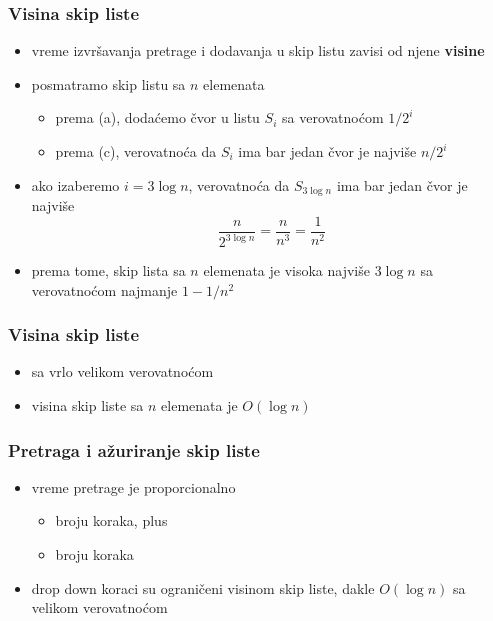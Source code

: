 \documentclass[compress]{beamer}
\begin{document}
\begin{frame}[fragile]
  \frametitle{Visina skip liste}
  \begin{itemize}
    \item vreme izvršavanja pretrage i dodavanja u skip listu zavisi od njene \textbf{visine}
    \item posmatramo skip listu sa $n$ elemenata
    \begin{itemize}
      \item prema (a), dodaćemo čvor u listu $S_i$ sa verovatnoćom $1/2^i$
      \item prema (c), verovatnoća da $S_i$ ima bar jedan čvor je najviše $n/2^i$
    \end{itemize}
    \item ako izaberemo $i=3\log n$, verovatnoća da $S_{3\log n}$ ima bar jedan čvor je najviše
    $$\frac{n}{2^{3\log n}} = \frac{n}{n^3} = \frac{1}{n^2}$$
    \item prema tome, skip lista sa $n$ elemenata je visoka najviše $3\log n$ sa verovatnoćom najmanje $1-1/n^2$
  \end{itemize}
\end{frame}

\begin{frame}[fragile]
  \frametitle{Visina skip liste}
  \begin{itemize}
    \item sa vrlo velikom verovatnoćom
    \item visina skip liste sa $n$ elemenata je $O(\log n)$
  \end{itemize}
\end{frame}

\begin{frame}[fragile]
  \frametitle{Pretraga i ažuriranje skip liste}
  \begin{itemize}
    \item vreme pretrage je proporcionalno
    \begin{itemize}
      \item broju  koraka, plus
      \item broju  koraka
    \end{itemize}
    \item drop down koraci su ograničeni visinom skip liste, dakle $O(\log n)$ sa velikom verovatnoćom
  \end{itemize}
\end{frame}
\end{document}
